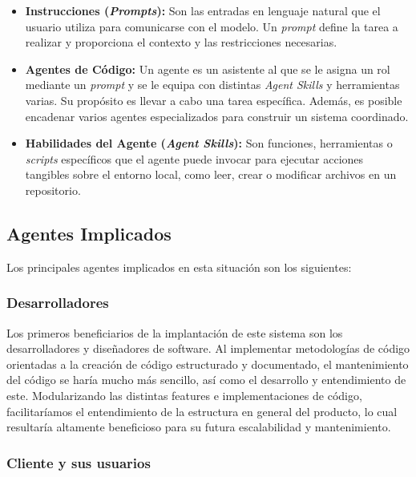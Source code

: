 \begin{itemize}
    \item \textbf{Instrucciones (\textit{Prompts}):} Son las entradas en lenguaje natural que el usuario utiliza para comunicarse con el modelo. Un \textit{prompt} define la tarea a realizar y proporciona el contexto y las restricciones necesarias.

    \item \textbf{Agentes de Código:} Un agente es un asistente al que se le asigna un rol mediante un \textit{prompt} y se le equipa con distintas \textit{Agent Skills} y herramientas varias. Su propósito es llevar a cabo una tarea específica. Además, es posible encadenar varios agentes especializados para construir un sistema coordinado. \cite{vscode_agents} \cite{wang_llm_agents_2024}

    \item \textbf{Habilidades del Agente (\textit{Agent Skills}):} Son funciones, herramientas o \textit{scripts} específicos que el agente puede invocar para ejecutar acciones tangibles sobre el entorno local, como leer, crear o modificar archivos en un repositorio. \cite{agentskills_home} \cite{yao_react_2023}
\end{itemize}

\subsection{Agentes Implicados}
\label{sec:agentes_implicados}

Los principales agentes implicados en esta situación son los siguientes:

\subsubsection{Desarrolladores}
\label{sec:desarrolladores}

Los primeros beneficiarios de la implantación de este sistema son los desarrolladores y diseñadores de software. Al implementar metodologías de código orientadas a la creación de código estructurado y documentado, el mantenimiento del código se haría mucho más sencillo, así como el desarrollo y entendimiento de este. Modularizando las distintas features e implementaciones de código, facilitaríamos el entendimiento de la estructura en general del producto, lo cual resultaría altamente beneficioso para su futura escalabilidad y mantenimiento.

\subsubsection{Cliente y sus usuarios}
\label{sec:cliente_usuarios}

